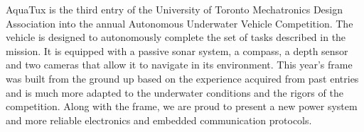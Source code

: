 
AquaTux is the third entry of the University of Toronto Mechatronics
Design Association into the annual Autonomous Underwater Vehicle
Competition.  The vehicle is designed to autonomously complete
the set of tasks described in the mission\footnotemark[1]. It is
equipped with a passive sonar system, a compass, a depth sensor and two cameras that allow it to navigate in its environment. This
year's frame was built from the ground up based on the experience
acquired from past entries and is much more adapted to the underwater
conditions and the rigors of the competition. Along with the frame, we are
proud to present a new power system and more reliable electronics and
embedded communication protocols.
